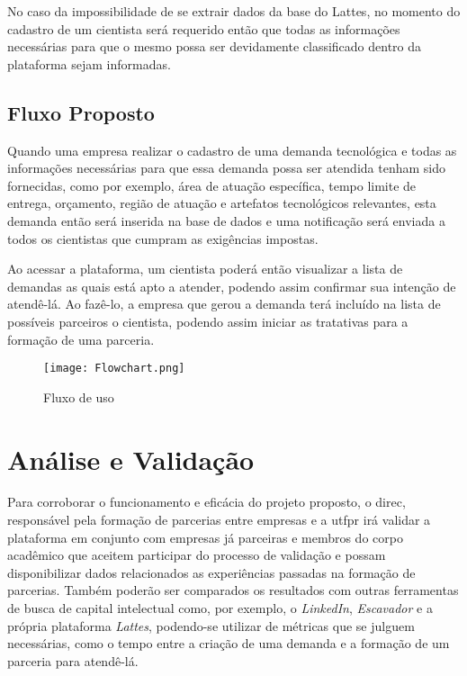 No caso da impossibilidade de se extrair dados da base do Lattes, no momento do cadastro de um cientista será requerido então que todas as informações necessárias para que o mesmo possa ser devidamente classificado dentro da plataforma sejam informadas. 

\subsection{Fluxo Proposto}\label{subsec:fluxo}

Quando uma empresa realizar o cadastro de uma demanda tecnológica e todas as informações necessárias para que essa demanda possa ser atendida tenham sido fornecidas, como por exemplo, área de atuação específica, tempo limite de entrega, orçamento, região de atuação e artefatos tecnológicos relevantes, esta demanda então será inserida na base de dados e uma notificação será enviada a todos os cientistas que cumpram as exigências impostas. 

Ao acessar a plataforma, um cientista poderá então visualizar a lista de demandas as quais está apto a atender, podendo assim confirmar sua intenção de atendê-lá. Ao fazê-lo, a empresa que gerou a demanda terá incluído na lista de possíveis parceiros o cientista, podendo assim iniciar as tratativas para a formação de uma parceria.

\begin{figure}[htb]
    \caption{Fluxo de uso}
    \texttt{[image: Flowchart.png]}
    \label{fig:fluxograma}
\end{figure}

\section{Análise e Validação}\label{sec:validacao}

Para corroborar o funcionamento e eficácia do projeto proposto, o \gls{direc}, responsável pela formação de parcerias entre empresas e a \gls{utfpr} irá validar a plataforma em conjunto com empresas já parceiras e membros do corpo acadêmico que aceitem participar do processo de validação e possam disponibilizar dados relacionados as experiências passadas na formação de parcerias. Também poderão ser comparados os resultados com outras ferramentas de busca de capital intelectual como, por exemplo, o \textit{LinkedIn}, \textit{Escavador} e a própria plataforma \textit{Lattes}, podendo-se utilizar de métricas que se julguem necessárias, como o tempo entre a criação de uma demanda e a formação de um parceria para atendê-lá.